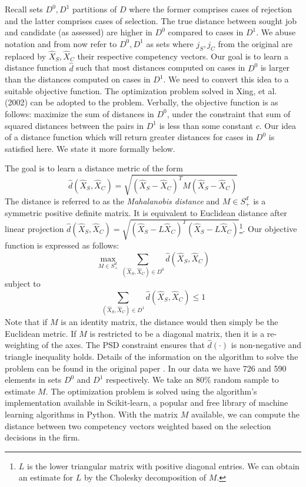 \documentclass{article}
\begin{document}
Recall sets \(D^0, D^1\) partitions of \(D\) where the former comprises cases of rejection and the latter comprises cases of selection. The true distance between sought job and candidate (as assessed) are higher in \(D^0\) compared to cases in \(D^1\). We abuse notation and from now refer to \(D^0, D^1\) as sets where \(j_S, j_C\) from the original are replaced by \( \hat{X}_S, \hat{X}_C \) their respective competency vectors. Our goal is to learn a distance function \( \hat{d} \) such that most distances computed on cases in \(D^0\) is larger than the distances computed on cases in \(D^1\). We need to convert this idea to a suitable objective function. The optimization problem solved in Xing, et al. (2002) can be adopted to the problem. Verbally, the objective function is as follows: maximize the sum of distances in \(D^0\), under the constraint that sum of squared distances between the pairs in \(D^1\) is less than some constant \(c\). Our idea of a distance function which will return greater distances for cases in \(D^0\) is satisfied here. We state it more formally below.


The goal is to learn a distance metric of the form
\[
\hat{d}(\hat{X}_S, \hat{X}_C) = \sqrt{(\hat{X}_S - \hat{X}_C)^T M (\hat{X}_S - \hat{X}_C)}
\]
The distance is referred to as the \textit{Mahalanobis distance} and \(M \in S_+^d\) is a symmetric positive definite matrix. It is equivalent to Euclidean distance after linear projection \(\hat{d}(\hat{X}_S, \hat{X}_C) = \sqrt{(\hat{X}_S - L\hat{X}_C)^T(\hat{X}_S - L\hat{X}_C)}\)\footnote{$L$ is the lower triangular matrix with positive diagonal entries. We can obtain an estimate for $L$ by the Cholesky decomposition of $M$.}. Our objective function is expressed as follows:
\[
\max_{M \in S_+^d} \sum_{(\hat{X}_S, \hat{X}_C) \in D^0} \hat{d}(\hat{X}_S, \hat{X}_C)
\]
subject to
\[
\sum_{(\hat{X}_S, \hat{X}_C) \in D^1} \hat{d}(\hat{X}_S, \hat{X}_C) \leq 1
\]
Note that if \(M\) is an identity matrix, the distance would then simply be the Euclidean metric. If \(M\) is restricted to be a diagonal matrix, then it is a re-weighting of the axes. The PSD constraint ensures that \(\hat{d}(\cdot)\) is non-negative and triangle inequality holds. Details of the information on the algorithm to solve the problem can be found in the original paper \autocite{Xing2002}. In our data we have 726 and 590 elements in sets \(D^0\) and \(D^1\) respectively. We take an 80\% random sample to estimate \(M\). The optimization problem is solved using the algorithm’s implementation available in Scikit-learn, a popular and free library of machine learning algorithms in Python. With the matrix \(M\) available, we can compute the distance between two competency vectors weighted based on the selection decisions in the firm.
\end{document}
